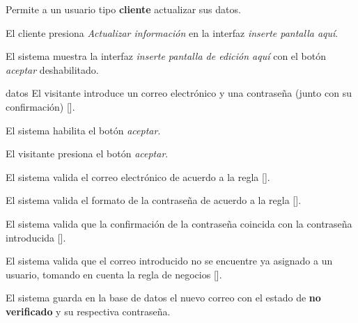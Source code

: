 %
%

{
  Permite a un usuario tipo \textbf{cliente} actualizar sus datos.

  \begin{trayectoriaPrincipal}

    \item El cliente presiona \textit{Actualizar información} en la
      interfaz \textit{inserte pantalla aquí}.

    \item El sistema muestra la interfaz
      \textit{inserte pantalla de edición aquí} con el botón \textit{aceptar}
      deshabilitado.

    \item[datos] El visitante introduce un correo electrónico y una contraseña
      (junto con su confirmación) [].

    \item El sistema habilita el botón \textit{aceptar}.

    \item El visitante presiona el botón \textit{aceptar}.

    \item El sistema valida el correo electrónico de acuerdo a la regla
      [].

    \item El sistema valida el formato de la contraseña de acuerdo a la regla
      [].

    \item El sistema valida que la confirmación de la contraseña coincida con
      la contraseña introducida
      [].

    \item El sistema valida que el correo introducido no se encuentre ya
      asignado a un usuario, tomando en cuenta la regla de negocios
      [].

    \item El sistema guarda en la base de datos el nuevo correo con el estado
      de \textbf{no verificado} y su respectiva contraseña.


\end{trayectoriaPrincipal}}
